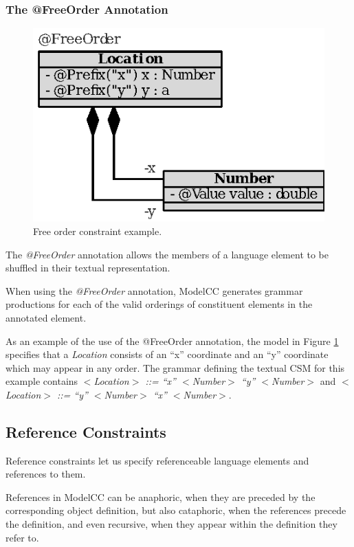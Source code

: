 \documentclass[a4paper,twoside,onecolumn]{article}
\newcommand{\etexttt}[1]{\textit{#1}}
\newcommand{\an}[1]{\emph{#1}} %
\begin{document}
\subsubsection{The @FreeOrder Annotation}

\begin{figure}[tb!]
\centering
\includegraphics[scale=1]{programfree.eps}
\caption{Free order constraint example.} \label{fig:programfree}
\end{figure}

The \an{@FreeOrder} annotation allows the members of a language element to be shuffled in their textual representation.

When using the \an{@FreeOrder} annotation, ModelCC generates grammar productions for each of the valid orderings of constituent elements in the annotated element.

As an example of the use of the @FreeOrder annotation, the model in Figure \ref{fig:programfree} specifies that a \emph{Location} consists of an ``x'' coordinate and an ``y'' coordinate which may appear in any order.
The grammar defining the textual CSM for this example contains \etexttt{$<$Location$>$ ::= ``x'' $<$Number$>$ ``y'' $<$Number$>$} and \etexttt{$<$Location$>$ ::= ``y'' $<$Number$>$ ``x'' $<$Number$>$}.

\subsection{Reference Constraints} \label{subsec:references}

Reference constraints let us specify referenceable language elements and references to them.

References in ModelCC can be anaphoric, when they are preceded by the corresponding object definition, but also cataphoric, when the references precede the definition, and even recursive, when they appear within the definition they refer to.
\end{document}

